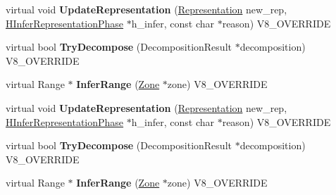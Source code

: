 \begin{DoxyCompactItemize}
\item 
\hypertarget{classv8_1_1internal_1_1_v8___f_i_n_a_l_a646a7a4ee98ffeb1773e958bd227f429}{}virtual void {\bfseries Update\+Representation} (\hyperlink{classv8_1_1internal_1_1_representation}{Representation} new\+\_\+rep, \hyperlink{classv8_1_1internal_1_1_h_infer_representation_phase}{H\+Infer\+Representation\+Phase} $\ast$h\+\_\+infer, const char $\ast$reason) V8\+\_\+\+O\+V\+E\+R\+R\+I\+D\+E\label{classv8_1_1internal_1_1_v8___f_i_n_a_l_a646a7a4ee98ffeb1773e958bd227f429}

\item 
\hypertarget{classv8_1_1internal_1_1_v8___f_i_n_a_l_a01868e84795163ab610a20c7f7c4f7ea}{}virtual bool {\bfseries Try\+Decompose} (Decomposition\+Result $\ast$decomposition) V8\+\_\+\+O\+V\+E\+R\+R\+I\+D\+E\label{classv8_1_1internal_1_1_v8___f_i_n_a_l_a01868e84795163ab610a20c7f7c4f7ea}

\item 
\hypertarget{classv8_1_1internal_1_1_v8___f_i_n_a_l_a7d7c752019e44fc1ba3895619da6a7f5}{}virtual Range $\ast$ {\bfseries Infer\+Range} (\hyperlink{classv8_1_1internal_1_1_zone}{Zone} $\ast$zone) V8\+\_\+\+O\+V\+E\+R\+R\+I\+D\+E\label{classv8_1_1internal_1_1_v8___f_i_n_a_l_a7d7c752019e44fc1ba3895619da6a7f5}

\item 
\hypertarget{classv8_1_1internal_1_1_v8___f_i_n_a_l_a646a7a4ee98ffeb1773e958bd227f429}{}virtual void {\bfseries Update\+Representation} (\hyperlink{classv8_1_1internal_1_1_representation}{Representation} new\+\_\+rep, \hyperlink{classv8_1_1internal_1_1_h_infer_representation_phase}{H\+Infer\+Representation\+Phase} $\ast$h\+\_\+infer, const char $\ast$reason) V8\+\_\+\+O\+V\+E\+R\+R\+I\+D\+E\label{classv8_1_1internal_1_1_v8___f_i_n_a_l_a646a7a4ee98ffeb1773e958bd227f429}

\item 
\hypertarget{classv8_1_1internal_1_1_v8___f_i_n_a_l_a01868e84795163ab610a20c7f7c4f7ea}{}virtual bool {\bfseries Try\+Decompose} (Decomposition\+Result $\ast$decomposition) V8\+\_\+\+O\+V\+E\+R\+R\+I\+D\+E\label{classv8_1_1internal_1_1_v8___f_i_n_a_l_a01868e84795163ab610a20c7f7c4f7ea}

\item 
\hypertarget{classv8_1_1internal_1_1_v8___f_i_n_a_l_a7d7c752019e44fc1ba3895619da6a7f5}{}virtual Range $\ast$ {\bfseries Infer\+Range} (\hyperlink{classv8_1_1internal_1_1_zone}{Zone} $\ast$zone) V8\+\_\+\+O\+V\+E\+R\+R\+I\+D\+E\label{classv8_1_1internal_1_1_v8___f_i_n_a_l_a7d7c752019e44fc1ba3895619da6a7f5}


\end{DoxyCompactItemize}
